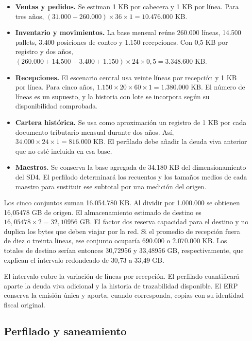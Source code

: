 \begin{itemize}
\item \textbf{Ventas y pedidos.} Se estiman 1 KB por cabecera y 1 KB por línea. Para tres años, $(\text{31.000}+\text{260.000})\times36\times1=\text{10.476.000}$ KB.
\item \textbf{Inventario y movimientos.} La base mensual reúne 260.000 líneas, 14.500 pallets, 3.400 posiciones de conteo y 1.150 recepciones. Con 0,5 KB por registro y dos años, $(\text{260.000}+\text{14.500}+\text{3.400}+\text{1.150})\times24\times0{,}5=\text{3.348.600}$ KB.
\item \textbf{Recepciones.} El escenario central usa veinte líneas por recepción y 1 KB por línea. Para cinco años, $\text{1.150}\times20\times60\times1=\text{1.380.000}$ KB. El número de líneas es un supuesto, y la historia con lote se incorpora según su disponibilidad comprobada.
\item \textbf{Cartera histórica.} Se usa como aproximación un registro de 1 KB por cada documento tributario mensual durante dos años. Así, $\text{34.000}\times24\times1=\text{816.000}$ KB. El perfilado debe añadir la deuda viva anterior que no esté incluida en esa base.
\item \textbf{Maestros.} Se conserva la base agregada de 34.180 KB del dimensionamiento del SD4. El perfilado determinará los recuentos y los tamaños medios de cada maestro para sustituir ese subtotal por una medición del origen.
\end{itemize}

Los cinco conjuntos suman 16.054.780 KB. Al dividir por 1.000.000 se obtienen 16,05478 GB de origen. El almacenamiento estimado de destino es $16{,}05478\times2=32{,}10956$ GB. El factor dos reserva capacidad para el destino y no duplica los bytes que deben viajar por la red. Si el promedio de recepción fuera de diez o treinta líneas, ese conjunto ocuparía 690.000 o 2.070.000 KB. Los totales de destino serían entonces 30,72956 y 33,48956 GB, respectivamente, que explican el intervalo redondeado de 30,73 a 33,49 GB.


El intervalo cubre la variación de líneas por recepción. El perfilado cuantificará aparte la deuda viva adicional y la historia de trazabilidad disponible. El ERP conserva la emisión única y aporta, cuando corresponda, copias con su identidad fiscal original.

\subsection{Perfilado y saneamiento}
\label{sec:sd5-5-3-2}

